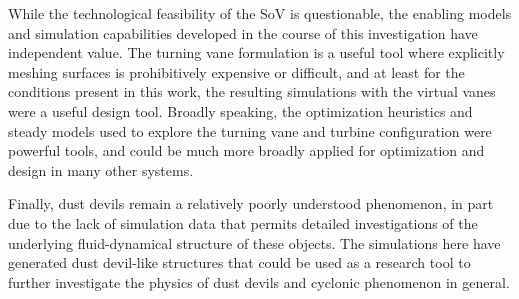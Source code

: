 While the technological feasibility of the SoV is questionable, 
the enabling models and simulation capabilities developed in the course
of this investigation have independent value. The turning vane
formulation is a useful tool where explicitly meshing surfaces is
prohibitively expensive or difficult, and at least for the conditions
present in this work, the resulting simulations with the virtual vanes
were a useful design tool. Broadly speaking, the optimization heuristics
and steady models used to explore the turning vane and turbine
configuration were powerful tools, and could be much more broadly
applied for optimization and design in many other systems.  


Finally, dust devils remain a relatively poorly understood phenomenon,
in part due to the lack of simulation data that permits detailed
investigations of the underlying fluid-dynamical structure of these
objects. The simulations here have generated dust devil-like structures
that could be used as a research tool to further investigate the physics
of dust devils and cyclonic phenomenon in general. 





